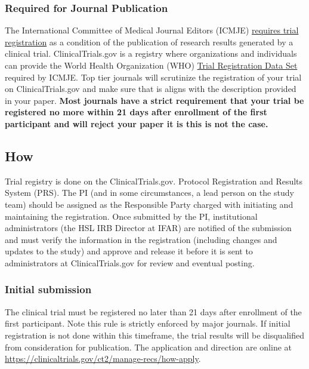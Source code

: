 \documentclass[]{book}
\begin{document}
\subsubsection{Required for Journal
Publication}\label{required-for-journal-publication}

The International Committee of Medical Journal Editors (ICMJE)
\href{http://www.icmje.org/recommendations/browse/publishing-and-editorial-issues/clinical-trial-registration.html}{requires
trial registration} as a condition of the publication of research
results generated by a clinical trial. ClinicalTrials.gov is a registry
where organizations and individuals can provide the World Health
Organization (WHO)
\href{http://www.who.int/ictrp/network/trds/en/index.html}{Trial
Registration Data Set} required by ICMJE. Top tier journals will
scrutinize the registration of your trial on ClinicalTrials.gov and make
sure that is aligns with the description provided in your paper.
\textbf{Most journals have a strict requirement that your trial be
registered no more within 21 days after enrollment of the first
participant and will reject your paper it is this is not the case.}

\subsection{How}\label{how-8}

Trial registry is done on the ClinicalTrials.gov. Protocol Registration
and Results System (PRS). The PI (and in some circumstances, a lead
person on the study team) should be assigned as the Responsible Party
charged with initiating and maintaining the registration. Once submitted
by the PI, institutional administrators (the HSL IRB Director at IFAR)
are notified of the submission and must verify the information in the
registration (including changes and updates to the study) and approve
and release it before it is sent to administrators at ClinicalTrials.gov
for review and eventual posting.

\subsubsection{Initial submission}\label{initial-submission}

The clinical trial must be registered no later than 21 days after
enrollment of the first participant. Note this rule is strictly enforced
by major journals. If initial registration is not done within this
timeframe, the trial results will be disqualified from consideration for
publication. The application and direction are online at
\url{https://clinicaltrials.gov/ct2/manage-recs/how-apply}.
\end{document}
